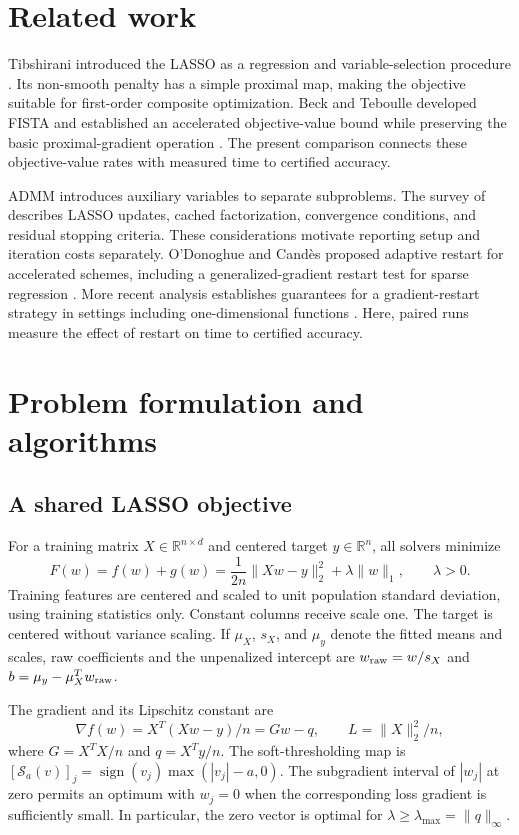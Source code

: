 \documentclass{article}
\newcommand{\soft}{\mathcal{S}}
\newcommand{\R}{\mathbb{R}}
\begin{document}
\section{Related work}
Tibshirani introduced the LASSO as a regression and variable-selection procedure \citep{tibshirani1996}. Its non-smooth penalty has a simple proximal map, making the objective suitable for first-order composite optimization. Beck and Teboulle developed FISTA and established an accelerated objective-value bound while preserving the basic proximal-gradient operation \citep{beck2009}. The present comparison connects these objective-value rates with measured time to certified accuracy.

ADMM introduces auxiliary variables to separate subproblems. The survey of \citet{boyd2011} describes LASSO updates, cached factorization, convergence conditions, and residual stopping criteria. These considerations motivate reporting setup and iteration costs separately. O'Donoghue and Cand\`es proposed adaptive restart for accelerated schemes, including a generalized-gradient restart test for sparse regression \citep{odonoghue2015}. More recent analysis establishes guarantees for a gradient-restart strategy in settings including one-dimensional functions \citep{moursi2023}. Here, paired runs measure the effect of restart on time to certified accuracy.

\section{Problem formulation and algorithms}
\subsection{A shared LASSO objective}
For a training matrix $X\in\R^{n\times d}$ and centered target $y\in\R^n$, all solvers minimize
\begin{equation}
 F(w)=f(w)+g(w)=\frac{1}{2n}\|Xw-y\|_2^2+\lambda\|w\|_1,\qquad \lambda>0.
 \label{eq:objective}
\end{equation}
Training features are centered and scaled to unit population standard deviation, using training statistics only. Constant columns receive scale one. The target is centered without variance scaling. If $\mu_X$, $s_X$, and $\mu_y$ denote the fitted means and scales, raw coefficients and the unpenalized intercept are $w_{\rm raw}=w/s_X$ and $b=\mu_y-\mu_X^T w_{\rm raw}$.

The gradient and its Lipschitz constant are
\begin{equation}
 \nabla f(w)=X^T(Xw-y)/n=Gw-q,\qquad L=\|X\|_2^2/n,
\end{equation}
where $G=X^TX/n$ and $q=X^Ty/n$. The soft-thresholding map is
$[\soft_a(v)]_j=\operatorname{sign}(v_j)\max(|v_j|-a,0)$.
The subgradient interval of $|w_j|$ at zero permits an optimum with $w_j=0$ when the corresponding loss gradient is sufficiently small. In particular, the zero vector is optimal for $\lambda\geq\lambda_{\max}=\|q\|_\infty$.
\end{document}
